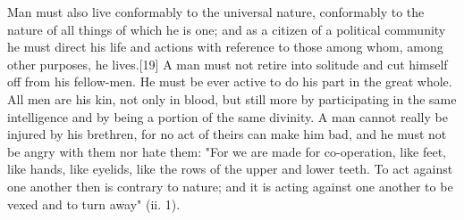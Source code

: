 Man must also live conformably to the universal nature, conformably to the nature of all things of which he is one; and as a citizen of a political community he must direct his life and actions with reference to those among whom, among other purposes, he lives.[19] A man must not retire into solitude and cut himself off from his fellow-men. He must be ever active to do his part in the great whole. All men are his kin, not only in blood, but still more by participating in the same intelligence and by being a portion of the same divinity. A man cannot really be injured by his brethren, for no act of theirs can make him bad, and he must not be angry with them nor hate them: "For we are made for co-operation, like feet, like hands, like eyelids, like the rows of the upper and lower teeth. To act against one another then is contrary to nature; and it is acting against one another to be vexed and to turn away" (ii. 1).


